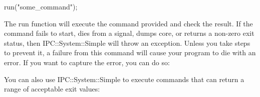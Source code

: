 \documentclass{report}
\begin{document}
\begin{itemize}
\begin{perlcode}
                run("some_command");
            \end{perlcode}
            \bigbreak \noindent 
            The run function will execute the command provided and check the result. If the command fails to start, dies from a signal, dumps core, or returns a non-zero exit status, then IPC::System::Simple will throw an exception. Unless you take steps to prevent it, a failure from this command will cause your program to die with an error. If you want to capture the error, you can do so:
            \bigbreak \noindent 
            \bigbreak \noindent 
            You can also use IPC::System::Simple to execute commands that can return a range of acceptable exit values:
            \bigbreak \noindent 
\end{itemize}
\end{document}
